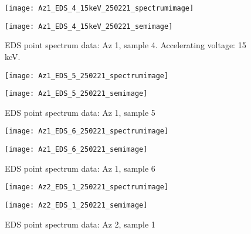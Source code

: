 \begin{figure}[H]
\centering
\begin{minipage}{.45\textwidth}
  \centering
  \texttt{[image: Az1\_EDS\_4\_15keV\_250221\_spectrumimage]}
\end{minipage}
\begin{minipage}{.45\textwidth}
  \centering
  \texttt{[image: Az1\_EDS\_4\_15keV\_250221\_semimage]}
\end{minipage}
\caption[EDS point spectrum data: Az 1, sample 4]{EDS point spectrum data: Az 1, sample 4. Accelerating voltage: 15 keV.}
\label{fig:az1_point_eds_4}
\end{figure}

\begin{figure}[H]
\centering
\begin{minipage}{.45\textwidth}
  \centering
  \texttt{[image: Az1\_EDS\_5\_250221\_spectrumimage]}
\end{minipage}
\begin{minipage}{.45\textwidth}
  \centering
  \texttt{[image: Az1\_EDS\_5\_250221\_semimage]}
\end{minipage}
\caption[EDS point spectrum data: Az 1, sample 5]{EDS point spectrum data: Az 1, sample 5}
\label{fig:az1_point_eds_5}
\end{figure}

\begin{figure}[H]
\centering
\begin{minipage}{.45\textwidth}
  \centering
  \texttt{[image: Az1\_EDS\_6\_250221\_spectrumimage]}
\end{minipage}
\begin{minipage}{.45\textwidth}
  \centering
  \texttt{[image: Az1\_EDS\_6\_250221\_semimage]}
\end{minipage}
\caption[EDS point spectrum data: Az 1, sample 6]{EDS point spectrum data: Az 1, sample 6}
\label{fig:az1_point_eds_6}
\end{figure}



\begin{figure}[H]
\centering
\begin{minipage}{.45\textwidth}
  \centering
  \texttt{[image: Az2\_EDS\_1\_250221\_spectrumimage]}
\end{minipage}
\begin{minipage}{.45\textwidth}
  \centering
  \texttt{[image: Az2\_EDS\_1\_250221\_semimage]}
\end{minipage}
\caption[EDS point spectrum data: Az 2, sample 1]{EDS point spectrum data: Az 2, sample 1}
\label{fig:az2_point_eds_1}
\end{figure}


